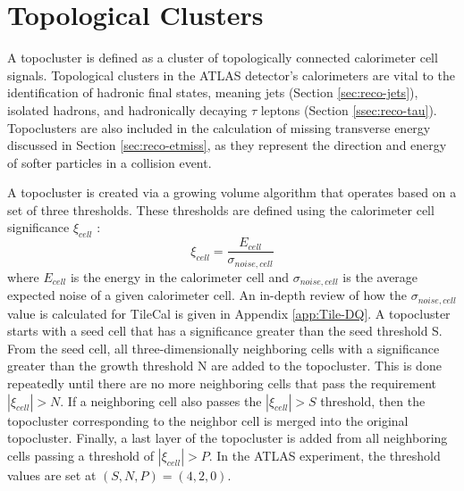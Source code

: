 
	\section{Topological Clusters}
		A topocluster is defined as a cluster of topologically connected calorimeter cell signals. Topological clusters in the \gls{ATLAS} detector's calorimeters are vital to the identification of hadronic final states, meaning jets (Section \ref{sec:reco-jets}), isolated hadrons, and hadronically decaying $\tau$ leptons (Section \ref{ssec:reco-tau}). Topoclusters are also included in the calculation of missing transverse energy discussed in Section \ref{sec:reco-etmiss}, as they represent the direction and energy of softer particles in a collision event. 

		A topocluster is created via a growing volume algorithm that operates based on a set of three thresholds. These thresholds are defined using the calorimeter cell significance $\xi_{cell}$ \cite{topocluster-perf}:
		\begin{equation}
		\xi_{cell} = \frac{E_{cell}}{\sigma_{noise, cell}}
		\end{equation}
		where $E_{cell}$ is the energy in the calorimeter cell and $\sigma_{noise, cell}$ is the average expected noise of a given calorimeter cell. An in-depth review of how the $\sigma_{noise, cell}$ value is calculated for TileCal is given in Appendix \ref{app:Tile-DQ}. A topocluster starts with a seed cell that has a significance greater than the seed threshold S. From the seed cell, all three-dimensionally neighboring cells with a significance greater than the growth threshold N are added to the topocluster. This is done repeatedly until there are no more neighboring cells that pass the requirement $|\xi_{cell}|>N$. If a neighboring cell also passes the $|\xi_{cell}|>S$ threshold, then the topocluster corresponding to the neighbor cell is merged into the original topocluster. Finally, a last layer of the topocluster is added from all neighboring cells passing a threshold of $|\xi_{cell}|>P$. In the \gls{ATLAS} experiment, the threshold values are set at $(S,N,P) = (4,2,0)$.

